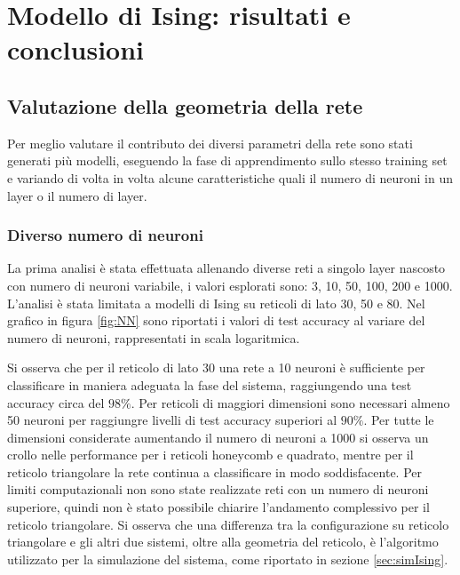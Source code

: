 \documentclass{article}
\begin{document}
\section{Modello di Ising: risultati e conclusioni}

\subsection{Valutazione della geometria della rete}
Per meglio valutare il contributo dei diversi parametri della rete sono stati generati più modelli, eseguendo la fase di apprendimento sullo stesso training set e variando di volta in volta alcune caratteristiche quali il numero di neuroni in un layer o il numero di layer.

\subsubsection{Diverso numero di neuroni}
La prima analisi è stata effettuata allenando diverse reti a singolo layer nascosto con numero di neuroni variabile, i valori esplorati sono: 3, 10, 50, 100, 200 e 1000.
L'analisi è stata limitata a modelli di Ising su reticoli di lato 30, 50 e 80.
Nel grafico in figura \ref{fig:NN} sono riportati i valori di test accuracy al variare del numero di neuroni, rappresentati in scala logaritmica.

Si osserva che per il reticolo di lato 30 una rete a 10 neuroni è sufficiente per classificare in maniera adeguata la fase del sistema, raggiungendo una test accuracy circa del $98\%$.
Per reticoli di maggiori dimensioni sono necessari almeno 50 neuroni per raggiungre livelli di test accuracy superiori al $90\%$.
Per tutte le dimensioni considerate aumentando il numero di neuroni a 1000 si osserva un crollo nelle performance per i reticoli honeycomb e quadrato, mentre per il reticolo triangolare la rete continua a classificare in modo soddisfacente.
Per limiti computazionali non sono state realizzate reti con un numero di neuroni superiore, quindi non è stato possibile chiarire l'andamento complessivo per il reticolo triangolare.
Si osserva che una differenza tra la configurazione su reticolo triangolare e gli altri due sistemi, oltre alla geometria del reticolo, è l'algoritmo utilizzato per la simulazione del sistema, come riportato in sezione \ref{sec:simIsing}.
\end{document}
